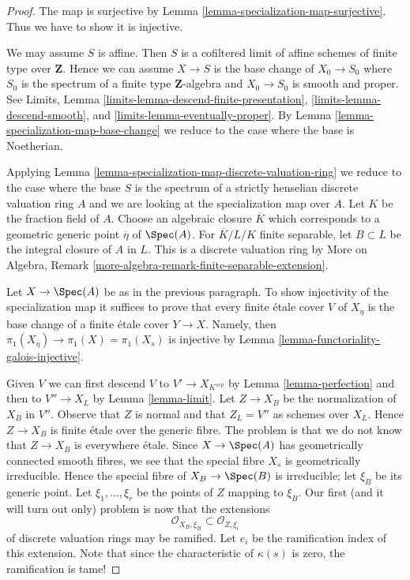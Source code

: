 \begin{proof}
The map is surjective by
Lemma \ref{lemma-specialization-map-surjective}.
Thus we have to show it is injective.

\medskip\noindent
We may assume $S$ is affine. Then $S$ is a cofiltered limit of affine
schemes of finite type over $\mathbf{Z}$.
Hence we can assume $X \to S$ is the
base change of $X_0 \to S_0$ where $S_0$ is the spectrum of a finite
type $\mathbf{Z}$-algebra and $X_0 \to S_0$ is smooth and proper.
See Limits, Lemma \ref{limits-lemma-descend-finite-presentation},
\ref{limits-lemma-descend-smooth}, and
\ref{limits-lemma-eventually-proper}. By
Lemma \ref{lemma-specialization-map-base-change}
we reduce to the case where the base is Noetherian.

\medskip\noindent
Applying Lemma \ref{lemma-specialization-map-discrete-valuation-ring}
we reduce to the case where the base $S$ is the spectrum of a
strictly henselian discrete valuation ring $A$ and we are
looking at the specialization map over $A$.
Let $K$ be the fraction field of $A$.
Choose an algebraic closure $\overline{K}$ which
corresponds to a geometric generic point $\overline{\eta}$ of $\Spec(A)$.
For $\overline{K}/L/K$ finite separable, let $B \subset L$ be the
integral closure of $A$ in $L$. This is a discrete
valuation ring by
More on Algebra, Remark \ref{more-algebra-remark-finite-separable-extension}.

\medskip\noindent
Let $X \to \Spec(A)$ be as in the previous paragraph.
To show injectivity of the specialization map
it suffices to prove that every finite
\'etale cover $V$ of $X_{\overline{\eta}}$ is the base
change of a finite \'etale cover $Y \to X$.
Namely, then $\pi_1(X_{\overline{\eta}}) \to \pi_1(X) = \pi_1(X_s)$
is injective by Lemma \ref{lemma-functoriality-galois-injective}.

\medskip\noindent
Given $V$ we can first descend $V$ to $V' \to X_{K^{sep}}$ by
Lemma \ref{lemma-perfection} and then to
$V'' \to X_L$ by Lemma \ref{lemma-limit}.
Let $Z \to X_B$ be the normalization of $X_B$ in $V''$.
Observe that $Z$ is normal and that $Z_L = V''$ as schemes
over $X_L$. Hence $Z \to X_B$ is finite \'etale over
the generic fibre. The problem is that we do not know that
$Z \to X_B$ is everywhere \'etale. Since $X \to \Spec(A)$
has geometrically connected smooth fibres, we see that
the special fibre $X_s$ is geometrically irreducible.
Hence the special fibre of $X_B \to \Spec(B)$ is irreducible;
let $\xi_B$ be its generic point. Let
$\xi_1, \ldots, \xi_r$ be the points of $Z$ mapping to
$\xi_B$. Our first (and it will turn out only) problem
is now that the extensions
$$
\mathcal{O}_{X_B, \xi_B} \subset \mathcal{O}_{Z, \xi_i}
$$
of discrete valuation rings may be ramified. Let $e_i$ be
the ramification index of this extension. Note that since the
characteristic of $\kappa(s)$ is zero, the ramification is tame!


\end{proof}
